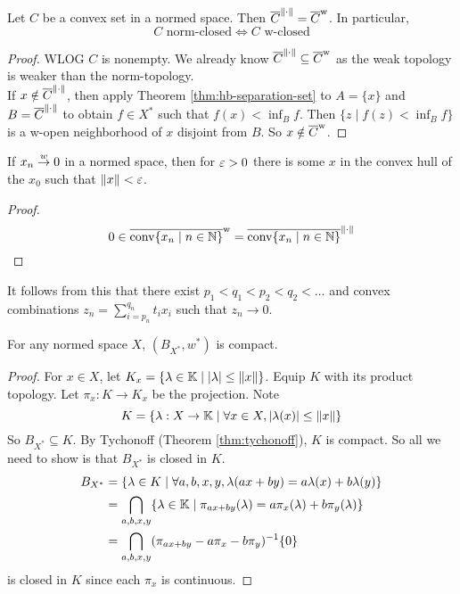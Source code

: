 \documentclass{article}
\begin{document}
\begin{thm}[Mazur]
  Let $C$ be a convex set in a normed space. Then $\overline{C}^{\left\lVert \cdot\right\rVert} = \overline{C}^{\text w}$. In particular,
  $$C \text{ norm-closed} \iff C \text{ w-closed}$$
\end{thm}
\begin{proof}
  WLOG $C$ is nonempty. We already know $\overline{C}^{\left\lVert \cdot\right\rVert} \subseteq \overline{C}^{\text w}$ as the weak topology is weaker than the norm-topology. \\
  If $x \notin \overline{C}^{\left\lVert \cdot\right\rVert}$, then apply Theorem \ref{thm:hb-separation-set} to $A = \{x\}$ and $B = \overline{C}^{\left\lVert \cdot\right\rVert}$ to obtain $f \in X^*$ such that $f(x) < \inf_B f$. Then $\{z \mid f(z) < \inf_B f\}$ is a w-open neighborhood of $x$ disjoint from $B$. So $x \notin \overline{C}^{\text w}$.
\end{proof}

\begin{cor}
  If $x_n \overset w\to 0$ in a normed space, then for $\varepsilon > 0$ there is some $x$ in the convex hull of the $x_0$ such that $\left\lVert x\right\rVert < \varepsilon$.
\end{cor}
\begin{proof}
  $$0 \in \overline{\operatorname{conv}\{x_n \mid n \in \mathbb N\}}^{\text w} = \overline{\operatorname{conv}\{x_n \mid n \in \mathbb N\}}^{\left\lVert \cdot\right\rVert}$$
\end{proof}

\begin{rmk}
  It follows from this that there exist $p_1 < q_1 < p_2 < q_2 < \dots $ and convex combinations $z_n = \sum_{i = p_n}^{q_n} t_i x_i$ such that $z_n \to 0$.
\end{rmk}

\newlec

\begin{thm}\label{thm:banach-alaoglu}
  For any normed space $X$, $(B_{X^*}, w^*)$ is compact.
\end{thm}
\begin{proof}
  For $x \in X$, let $K_x = \{\lambda \in \mathbb K \mid \left\lvert \lambda\right\rvert \le \left\lVert x\right\rVert\}$. Equip $K$ with its product topology. Let $\pi_x : K \to K_x$ be the projection. Note
  $$K = \{\lambda : X \to \mathbb K \mid \forall x \in X, \left\lvert \lambda(x)\right\rvert \le \left\lVert x\right\rVert\}$$
  So $B_{X^*} \subseteq K$. By Tychonoff (Theorem \ref{thm:tychonoff}), $K$ is compact. So all we need to show is that $B_{X^*}$ is closed in $K$.
  \begin{align*}
    B_{X^*}
    & = \{\lambda \in K \mid \forall a, b, x, y, \lambda(ax + by) = a\lambda(x) + b\lambda(y)\} \\
    & = \bigcap_{a, b, x, y} \{\lambda \in \mathbb K \mid \pi_{ax + by}(\lambda) = a\pi_x(\lambda) + b\pi_y(\lambda)\} \\
    & = \bigcap_{a, b, x, y} (\pi_{ax + by} - a\pi_x - b\pi_y)^{-1}\{0\}
  \end{align*}
  is closed in $K$ since each $\pi_x$ is continuous.
\end{proof}
\end{document}
